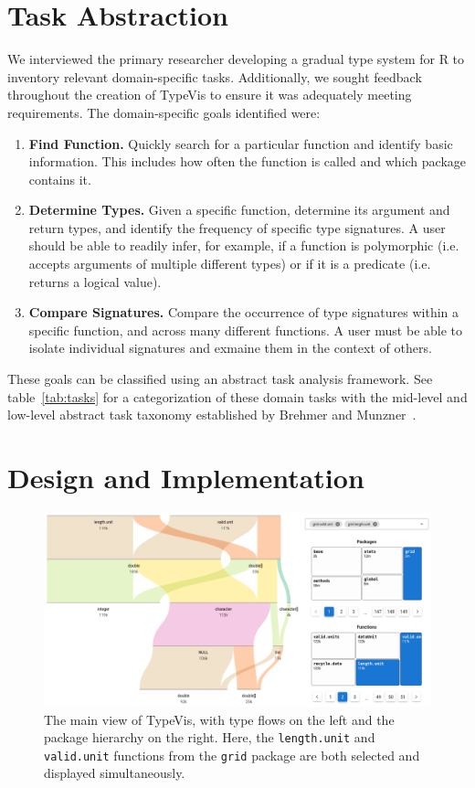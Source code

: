 \documentclass{vgtc}                          %
\newcommand{\typevis}{{\sc TypeVis}\xspace}
\begin{document}
\section{Task Abstraction}

We interviewed the primary researcher developing a gradual type system for R
to inventory relevant domain-specific tasks.
Additionally, we sought feedback throughout the creation of \typevis
to ensure it was adequately meeting requirements.
The domain-specific goals identified were:

\begin{enumerate}
\item {\bf Find Function.} Quickly search for a particular function and identify basic information. This includes how often the function is called and which package contains it.
\item {\bf Determine Types.} Given a specific function,
  determine its argument and return types, and identify the frequency of specific type signatures.
  A user should be able to readily infer, for example,
  if a function is polymorphic (i.e. accepts arguments of multiple different types) or if it is a predicate (i.e. returns a logical value).
\item {\bf Compare Signatures.} Compare the occurrence of type signatures within a specific function, and across many different functions. A user must be able to isolate individual signatures and exmaine them in the context of others.
\end{enumerate}

These goals can be classified using an abstract task analysis framework.
See table~\ref{tab:tasks} for a categorization of these domain tasks
with the mid-level and low-level abstract task taxonomy
established by Brehmer and Munzner~\cite{brehmer:2013}.


\section{Design and Implementation}

\begin{figure}
 \centering
 \includegraphics[width=\linewidth]{img/typevis.png}
 \caption{The main view of \typevis, with type flows on the left and the package hierarchy on the right. Here, the {\tt length.unit} and {\tt valid.unit} functions from the {\tt grid} package are both selected and displayed simultaneously.}
 \label{fig:typevis}
\end{figure}
\end{document}
